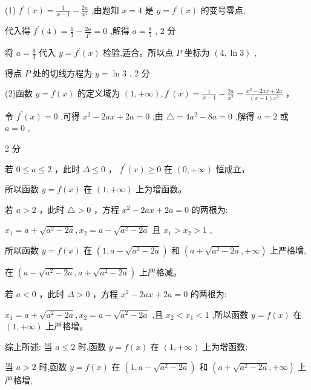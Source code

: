 \documentclass[10pt]{article}
\newcommand*\circled[1]{\tikz[baseline=(char.base)]{\node[shape=circle,draw,inner sep=1.5pt] (char) {\small #1};}}
\begin{document}
(1) \({f}^{\prime }\left( x\right)  = \frac{1}{x - 1} - \frac{2a}{{x}^{2}}\) ,由题知 \(x = 4\) 是 \(y = {f}^{\prime }\left( x\right)\) 的变号零点,

代入得 \({f}^{\prime }\left( 4\right)  = \frac{1}{3} - \frac{2a}{{4}^{2}} = 0\) ,解得 \(a = \frac{8}{3}\) , 2 分

将 \(a = \frac{8}{3}\) 代入 \(y = {f}^{\prime }\left( x\right)\) 检验,适合。所以点 \(P\) 坐标为 \(\left( {4,\ln 3}\right)\) ,

得点 \(P\) 处的切线方程为 \(y = \ln 3\) . 2 分

(2)函数 \(y = f\left( x\right)\) 的定义域为 \(\left( {1, + \infty }\right) ,{f}^{\prime }\left( x\right)  = \frac{1}{x - 1} - \frac{2a}{{x}^{2}} = \frac{{x}^{2} - {2ax} + {2a}}{\left( {x - 1}\right) {x}^{2}}\) ，

令 \({f}^{\prime }\left( x\right)  = 0\) ,可得 \({x}^{2} - {2ax} + {2a} = 0\) ,由 \(\bigtriangleup  = 4{a}^{2} - {8a} = 0\) ,解得 \(a = 2\) 或 \(a = 0\) ,

2 分

 \circled{1}  若 \(0 \leq  a \leq  2\) ，此时 \(\Delta  \leq  0\) ， \({f}^{\prime }\left( x\right)  \geq  0\) 在 \(\left( {0, + \infty }\right)\) 恒成立，

所以函数 \(y = f\left( x\right)\) 在 \(\left( {1, + \infty }\right)\) 上为增函数。

 \circled{2} 若 \(a > 2\) ，此时 \(\bigtriangleup   > 0\) ，方程 \({x}^{2} - {2ax} + {2a} = 0\) 的两根为:

\({x}_{1} = a + \sqrt{{a}^{2} - {2a}},{x}_{2} = a - \sqrt{{a}^{2} - {2a}}\) 且 \({x}_{1} > {x}_{2} > 1\) ,

所以函数 \(y = f\left( x\right)\) 在 \(\left( {1,a - \sqrt{{a}^{2} - {2a}}}\right)\) 和 \(\left( {a + \sqrt{{a}^{2} - {2a}}, + \infty }\right)\) 上严格增,

在 \(\left( {a - \sqrt{{a}^{2} - {2a}},a + \sqrt{{a}^{2} - {2a}}}\right)\) 上严格减。

 \circled{3} 若 \(a < 0\) ，此时 \(\Delta  > 0\) ，方程 \({x}^{2} - {2ax} + {2a} = 0\) 的两根为:

\({x}_{1} = a + \sqrt{{a}^{2} - {2a}},{x}_{2} = a - \sqrt{{a}^{2} - {2a}}\) ,且 \({x}_{2} < {x}_{1} < 1\) ,所以函数 \(y = f\left( x\right)\) 在 \(\left( {1, + \infty }\right)\) 上严格增。

综上所述: 当 \(a \leq  2\) 时,函数 \(y = f\left( x\right)\) 在 \(\left( {1, + \infty }\right)\) 上为增函数;

当 \(a > 2\) 时,函数 \(y = f\left( x\right)\) 在 \(\left( {1,a - \sqrt{{a}^{2} - {2a}}}\right)\) 和 \(\left( {a + \sqrt{{a}^{2} - {2a}}, + \infty }\right)\) 上严格增,
\end{document}
